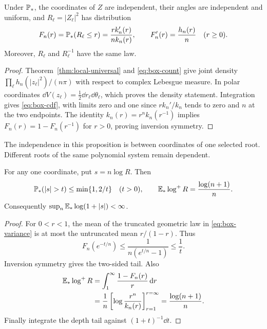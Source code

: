 \begin{proposition}\label{prop:box-root-law}
Under $\mathbb P_*$, the coordinates of $Z$ are independent, their angles are
independent and uniform, and $R_\ell=|Z_\ell|^2$ has distribution
\begin{equation}\label{eq:box-cdf}
 F_n(r)=\mathbb P_*(R_\ell\le r)=\frac{r k_n'(r)}{n k_n(r)},\qquad
 F_n'(r)=\frac{h_n(r)}n\quad(r\ge0).
\end{equation}
Moreover, $R_\ell$ and $R_\ell^{-1}$ have the same law.
\end{proposition}
\begin{proof}
Theorem~\ref{thm:local-universal} and \eqref{eq:box-count} give joint density
$\prod_\ell h_n(|z_\ell|^2)/(n\pi)$ with respect to complex Lebesgue measure.
In polar coordinates $\dd V(z_\ell)=\tfrac12\dd r_\ell\dd\theta_\ell$,
which proves the density statement. Integration gives \eqref{eq:box-cdf},
with limits zero and one since $r k_n'/k_n$ tends to zero and $n$ at the
two endpoints. The identity $k_n(r)=r^n k_n(r^{-1})$ implies
$F_n(r)=1-F_n(r^{-1})$ for $r>0$, proving inversion symmetry.
\end{proof}

The independence in this proposition is between coordinates of one selected
root. Different roots of the same polynomial system remain dependent.

\begin{lemma}\label{lem:box-depth}
For any one coordinate, put $s=n\log R$. Then
\begin{equation}\label{eq:box-depth}
 \Pstar(|s|>t)\le\min\{1,2/t\}\quad(t>0),\qquad
 \Estar\log^+R=\frac{\log(n+1)}n.
\end{equation}
Consequently $\sup_n\mathbb E_*\log(1+|s|)<\infty$.
\end{lemma}
\begin{proof}
For $0<r<1$, the mean of the truncated geometric law in
\eqref{eq:box-variance} is at most the untruncated mean $r/(1-r)$.
Thus
\[
 F_n(e^{-t/n})\le\frac1{n(e^{t/n}-1)}\le\frac1t.
\]
Inversion symmetry gives the two-sided tail. Also
\begin{align*}
 \mathbb E_*\log^+R
 &=\int_1^\infty\frac{1-F_n(r)}r\,\mathrm d r\\
 &=\frac1n\left[\log\frac{r^n}{k_n(r)}\right]_{r=1}^{r=\infty}
 =\frac{\log(n+1)}n.
\end{align*}
Finally integrate the depth tail against $(1+t)^{-1}\dd t$.
\end{proof}

